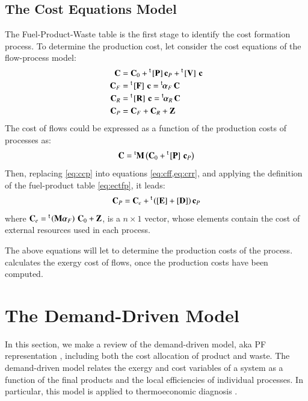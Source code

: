 \documentclass{ecos2018}
\begin{document}
\subsection{The Cost Equations Model}
The Fuel-Product-Waste table is the first stage to identify the cost formation process. To determine the production cost, let consider the cost equations of the flow-process model:
\begin{align}
\mathbf{C}&=\mathbf{C}_0+\prescript{\smash{\mathsf{t}}}{}{\mskip-1mu}\left[ \textbf{P} \right]\mathbf{c}_P+\prescript{\smash{\mathsf{t}}}{}{\mskip-1mu}\left[ \textbf{V} \right]\,\mathbf{c} \\
\mathbf{C}_F&=\prescript{\smash{\mathsf{t}}}{}{\mskip-1mu}\left[ \textbf{F} \right]\,\mathbf{c}=\prescript{\smash{\mathsf{t}}}{}{\mskip-1mu}\bm{\alpha}_F\,\mathbf{C} \label{eq:cff} \\
\mathbf{C}_R&=\prescript{\smash{\mathsf{t}}}{}{\mskip-1mu}\left[ \textbf{R} \right]\,\mathbf{c} = \prescript{\smash{\mathsf{t}}}{}{\mskip-1mu}\bm{\alpha}_R\,\mathbf{C} \label{eq:crr} \\
\mathbf{C}_P&=\mathbf{C}_F+\mathbf{C}_R+\mathbf{Z}
\end{align}
The cost of flows could be expressed as a function of the production costs of processes as:
\begin{equation}
\label{eq:ccp}
\mathbf{C}=\prescript{\smash{\mathrm{t}}}{}{\mathbf{M}}\left(\mathbf{C}_0 + \prescript{\smash{\mathsf{t}}}{}{\mskip-1mu}\left[ \textbf{P} \right]\,\mathbf{c}_P\right)
\end{equation}
Then, replacing \cref{eq:ccp} into equations \cref{eq:cff,eq:crr}, and applying the definition of the fuel-product table \eqref{eq:ectfp}, it leads:
\begin{equation}
\label{eq:CPt}
\mathbf{C}_P=\mathbf{C}_e + \prescript{\smash{\mathsf{t}}}{}{\mskip-1mu}\left(\left[ \textbf{E} \right]+\left[ \textbf{D} \right]\right) \mathbf{c}_P
\end{equation}
where $\mathbf{C}_e= \prescript{\smash{\mathsf{t}}}{}{\mskip-1mu}\left(\mathbf{M} \bm{\alpha}_F \right) \, \mathbf{C}_0 + \mathbf{Z}$, is a $n\times 1$ vector, whose elements contain the cost of external resources used in each process.

The above equations will let to determine the production costs of the process.  calculates the exergy cost of flows, once the production costs have been computed.

\section{The Demand-Driven Model}
In this section, we make a review of the demand-driven model, aka PF representation \cite{Torres09}, including both the cost allocation of product and waste.
The demand-driven model relates the exergy and cost variables of a system as a function of the final products and the local efficiencies of individual processes. In particular, this model is applied to thermoeconomic diagnosis \cite{TADEUS2004}.
\end{document}
